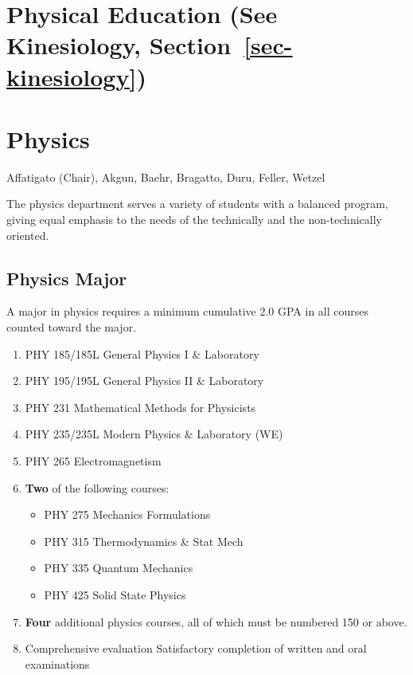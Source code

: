 \documentclass[
  letterpaper,
]{scrbook}
\providecommand{\tightlist}{%
  \setlength{\itemsep}{0pt}\setlength{\parskip}{0pt}}
\begin{document}
\section{\texorpdfstring{Physical Education (See Kinesiology,
Section~\ref{sec-kinesiology})}{Physical Education (See Kinesiology, Section~)}}\label{physical-education-see-kinesiology-sec-kinesiology}

\section{Physics}\label{physics}

Affatigato (Chair), Akgun, Baehr, Bragatto, Duru, Feller, Wetzel

The physics department serves a variety of students with a balanced
program, giving equal emphasis to the needs of the technically and the
non-technically oriented.

\subsection{Physics Major}\label{physics-major}

A major in physics requires a minimum cumulative 2.0 GPA in all courses
counted toward the major.

\begin{enumerate}
\def\labelenumi{\arabic{enumi}.}
\item
  PHY 185/185L General Physics I \& Laboratory
\item
  PHY 195/195L General Physics II \& Laboratory
\item
  PHY 231 Mathematical Methods for Physicists
\item
  PHY 235/235L Modern Physics \& Laboratory (WE)
\item
  PHY 265 Electromagnetism
\item
  \textbf{Two} of the following courses:

  \begin{itemize}
  \tightlist
  \item
    PHY 275 Mechanics Formulations
  \item
    PHY 315 Thermodynamics \& Stat Mech
  \item
    PHY 335 Quantum Mechanics
  \item
    PHY 425 Solid State Physics
  \end{itemize}
\item
  \textbf{Four} additional physics courses, all of which must be
  numbered 150 or above.
\item
  Comprehensive evaluation Satisfactory completion of written and oral
  examinations
\end{enumerate}
\end{document}

